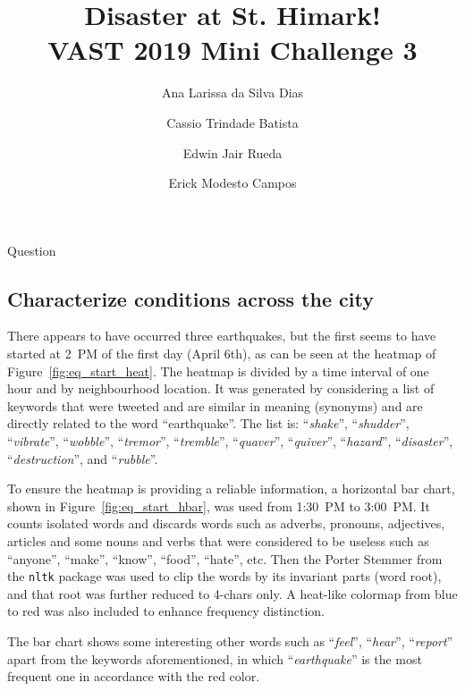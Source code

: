 \documentclass{article}
\author{Ana Larissa da Silva Dias \and Cassio Trindade Batista \and Edwin Jair Rueda \and Erick Modesto Campos}
\title{Disaster at St. Himark!\\VAST 2019 Mini Challenge 3}
\begin{document}
\maketitle

\begin{section}{Question}
\subsection{Characterize conditions across the city}
There appears to have occurred three earthquakes, but the first seems to
have started at 2~PM of the first day (April 6th), as
can be seen at the heatmap of Figure~\ref{fig:eq_start_heat}. The heatmap is
divided by a time interval of one hour and by neighbourhood location. It was
generated by considering a list of keywords that were tweeted and are similar in 
meaning (synonyms) and are directly related to the word ``earthquake''. The list 
is: ``\emph{shake}'', ``\emph{shudder}'', ``\emph{vibrate}'', ``\emph{wobble}'',
``\emph{tremor}'', ``\emph{tremble}'', ``\emph{quaver}'', ``\emph{quiver}'',
``\emph{hazard}'', ``\emph{disaster}'', ``\emph{destruction}'', and
``\emph{rubble}''.

To ensure the heatmap is providing a reliable information, a horizontal bar
chart, shown in Figure~\ref{fig:eq_start_hbar}, was used from 1:30~PM to 
3:00~PM. It counts isolated 
words and discards words such as adverbs, pronouns, adjectives, articles and 
some nouns and verbs that were considered to be useless such as ``anyone'',
``make'', ``know'', ``food'', ``hate'', etc. Then the Porter Stemmer from the
\texttt{nltk} package was used to clip the words by its invariant parts (word 
root), and that root was further reduced to 4-chars only. A heat-like colormap
from blue to red was also included to enhance frequency distinction. 

The bar chart shows some interesting other words such as ``\emph{feel}'',
``\emph{hear}'', ``\emph{report}'' apart from the keywords aforementioned, in
which ``\emph{earthquake}'' is the most frequent one in accordance with the red
color.


\end{section}
\end{document}
